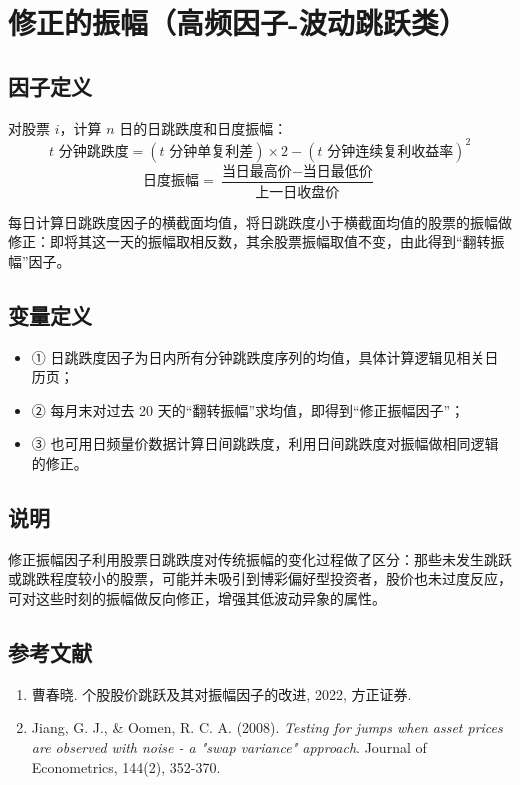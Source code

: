 \documentclass{article}
\begin{document}
\section{修正的振幅（高频因子-波动跳跃类）}

\subsection{因子定义}


对股票 \( i \)，计算 \( n \) 日的日跳跌度和日度振幅：
\begin{equation}
    t \text{ 分钟跳跌度} = (t \text{ 分钟单复利差}) \times 2 - (t \text{ 分钟连续复利收益率})^2
\end{equation}
\begin{equation}
    \text{日度振幅} = \frac{\text{当日最高价} - \text{当日最低价}}{\text{上一日收盘价}}
\end{equation}

每日计算日跳跌度因子的横截面均值，将日跳跌度小于横截面均值的股票的振幅做修正：即将其这一天的振幅取相反数，其余股票振幅取值不变，由此得到“翻转振幅”因子。

\subsection{变量定义}
\begin{itemize}
    \item ① 日跳跌度因子为日内所有分钟跳跌度序列的均值，具体计算逻辑见相关日历页；
    \item ② 每月末对过去 20 天的“翻转振幅”求均值，即得到“修正振幅因子”；
    \item ③ 也可用日频量价数据计算日间跳跌度，利用日间跳跌度对振幅做相同逻辑的修正。
\end{itemize}

\subsection{说明}
修正振幅因子利用股票日跳跌度对传统振幅的变化过程做了区分：那些未发生跳跃或跳跌程度较小的股票，可能并未吸引到博彩偏好型投资者，股价也未过度反应，可对这些时刻的振幅做反向修正，增强其低波动异象的属性。

\subsection{参考文献}
\begin{enumerate}
    \item 曹春晓. 个股股价跳跃及其对振幅因子的改进, 2022, 方正证券.
    \item Jiang, G. J., \& Oomen, R. C. A. (2008). \textit{Testing for jumps when asset prices are observed with noise - a "swap variance" approach}. Journal of Econometrics, 144(2), 352-370.
\end{enumerate}
\end{document}
